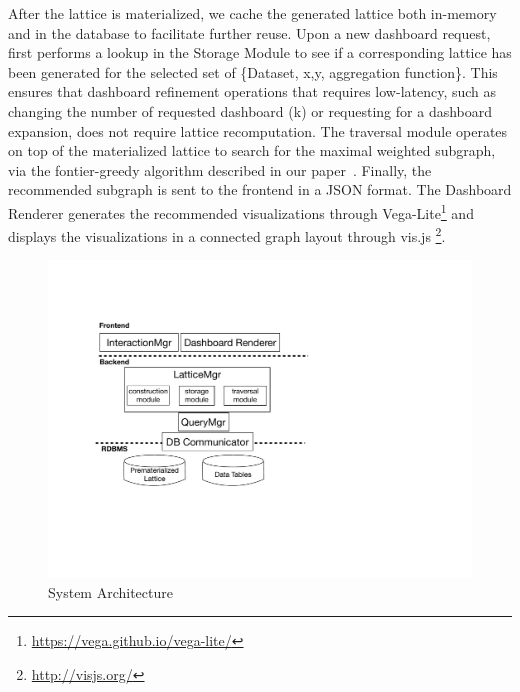 After the lattice is materialized, we cache the generated lattice both in-memory and in the database to facilitate further reuse. Upon a new dashboard request, \vispilot first performs a lookup in the Storage Module to see if a corresponding lattice has been generated for the selected set of \{Dataset, x,y, aggregation function\}. This ensures that dashboard refinement operations that requires low-latency, such as changing the number of requested dashboard (k) or requesting for a dashboard expansion, does not require lattice recomputation. The traversal module operates on top of the materialized lattice to search for the maximal weighted subgraph, via the fontier-greedy algorithm described in our paper~\cite{Lee2019}. Finally, the recommended subgraph is sent to the frontend in a JSON format. The Dashboard Renderer generates the recommended visualizations through Vega-Lite\footnote{\url{https://vega.github.io/vega-lite/}} and displays the visualizations in a connected graph layout through vis.js \footnote{\url{http://visjs.org/}}. 
\begin{figure}[ht!]
\centering
\includegraphics[width=0.9\linewidth]{figures/architecture.pdf}
\caption{\vispilot System Architecture}
\label{fig:architecture}
\vspace{-10pt}
\end{figure}


